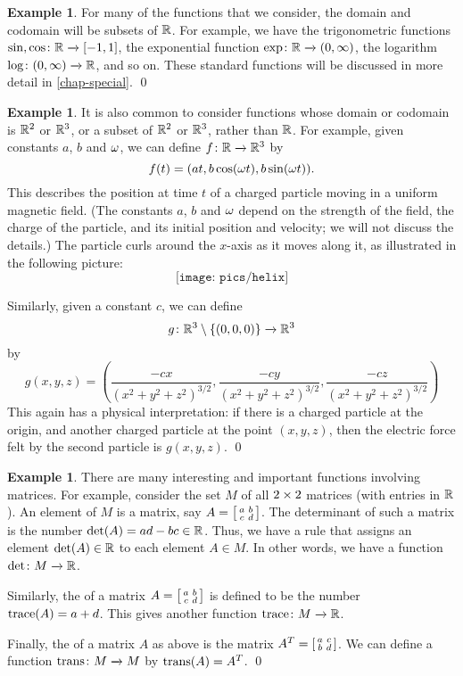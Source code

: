 \documentclass[a4paper]{book}
\theoremstyle{definition}
\newtheorem{example}[theorem]{Example}
\begin{document}
\begin{example}
 For many of the functions that we consider, the domain and codomain
 will be subsets of ${\mathbb{R}}$.  For example, we have the trigonometric
 functions $\sin,\cos\colon{\mathbb{R}}\xrightarrow{}[-1,1]$, the exponential function
 $\exp\colon{\mathbb{R}}\xrightarrow{}(0,\infty)$, the logarithm $\log\colon(0,\infty)\xrightarrow{}{\mathbb{R}}$,
 and so on.  These standard functions will be discussed in more detail
 in \autoref{chap-special}. \qed
\end{example}

\begin{example}
 It is also common to consider functions whose domain or codomain is
 ${\mathbb{R}}^2$ or ${\mathbb{R}}^3$, or a subset of ${\mathbb{R}}^2$ or ${\mathbb{R}}^3$, rather than ${\mathbb{R}}$.
 For example, given constants $a$, $b$ and $\omega$, we can define
 $f\colon{\mathbb{R}}\xrightarrow{}{\mathbb{R}}^3$ by
 \[ f(t) = (at,b\cos(\omega t),b\sin(\omega t)). \]
 This describes the position at time $t$ of a charged particle moving
 in a uniform magnetic field.  (The constants $a$, $b$ and $\omega$
 depend on the strength of the field, the charge of the particle, and
 its initial position and velocity; we will not discuss the details.)
 The particle curls around the $x$-axis as it moves along it, as
 illustrated in the following picture:
 \[ \texttt{[image: pics/helix]} \]

 Similarly, given a constant $c$, we can define
 \[ g\colon{\mathbb{R}}^3\setminus\{(0,0,0)\}\xrightarrow{}{\mathbb{R}}^3 \]
 by
 \[ g(x,y,z) =
     \left(\frac{-cx}{(x^2+y^2+z^2)^{3/2}},
           \frac{-cy}{(x^2+y^2+z^2)^{3/2}},
           \frac{-cz}{(x^2+y^2+z^2)^{3/2}}\right)
 \]
 This again has a physical interpretation: if there is a charged
 particle at the origin, and another charged particle at the point
 $(x,y,z)$, then the electric force felt by the second particle is
 $g(x,y,z)$. \qed
\end{example}

\begin{example}
 There are many interesting and important functions involving
 matrices.  For example, consider the set $M$ of all $2\times 2$
 matrices (with entries in ${\mathbb{R}}$).  An element of $M$ is a matrix, say
 $A=\left[\begin{smallmatrix} a&b\\c&d\end{smallmatrix}\right]$.  The determinant of such a matrix is the
 number $\det(A)=ad-bc\in{\mathbb{R}}$.  Thus, we have a rule that assigns an
 element $\det(A)\in{\mathbb{R}}$ to each element $A\in M$.  In other words, we
 have a function $\det\colon M\xrightarrow{}{\mathbb{R}}$.
 
 Similarly, the  of a matrix $A=\left[\begin{smallmatrix} a&b\\c&d\end{smallmatrix}\right]$ is
 defined to be the number $\operatorname{trace}(A)=a+d$.  This gives another function
 $\operatorname{trace}\colon M\xrightarrow{}{\mathbb{R}}$.

 Finally, the  of a matrix $A$ as above is the matrix
 $A^T=\left[\begin{smallmatrix} a&c\\b&d\end{smallmatrix}\right]$.  We can define a function $\operatorname{trans}\colon M\xrightarrow{}M$
 by $\operatorname{trans}(A)=A^T$. \qed
\end{example}
\end{document}
